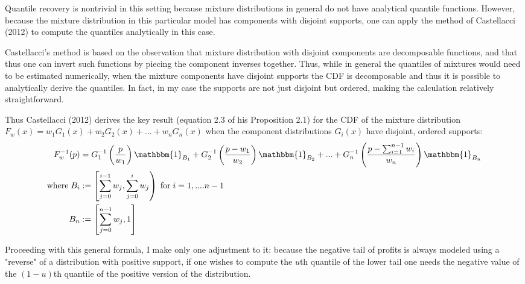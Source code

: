 \documentclass[english,12pt]{article}\usepackage{lmodern}
\numberwithin{equation}{section}
\begin{document}
 Quantile recovery is nontrivial in this setting because mixture distributions in general do not have analytical quantile functions. However, because the mixture distribution in this particular model has components with disjoint supports, one can apply the method of Castellacci (2012) to compute the quantiles analytically in this case.
 
Castellacci's method is based on the observation that mixture distribution with disjoint components are decomposable functions, and that thus one can invert such functions by piecing the component inverses together.  Thus, while in general the quantiles of mixtures would need to be estimated numerically, when the mixture components have disjoint supports the CDF is decomposable and thus it is possible to analytically derive the quantiles. In fact, in my case the supports are not just disjoint but ordered, making the calculation relatively straightforward. 

Thus Castellacci (2012) derives the key result (equation 2.3 of his Proposition 2.1) for the CDF of the mixture distribution $F_{w}(x) = w_1 G_1(x) + w_2 G_2 (x) + ... + w_n G_n (x)$ when the component distributions $G_i (x)$ have disjoint, ordered supports:
\begin{equation}
\begin{aligned}
F^{-1}_{w} (p) &= G_1^{-1}\left( \frac{p}{w_1} \right) \mathbbm{1}_{B_1}  +  G_2^{-1}\left( \frac{p - w_1}{w_2} \right) \mathbbm{1}_{B_2} + ... +  G_n^{-1}\left( \frac{p - \sum_{i=1}^{n-1} w_i}{w_n} \right) \mathbbm{1}_{B_n}\\
\text{where} \; B_{i} &:= \left[ \sum_{j=0}^{i-1} w_j, \sum_{j=0}^i w_j \right) \; \text{for} \; i = 1,....n-1 \\
B_n &:=  \left[ \sum_{j=0}^{n-1} w_j, 1\right]
\end{aligned}
\end{equation}

Proceeding with this general formula, I make only one adjustment to it: because the negative tail of profits is always modeled using a "reverse" of a distribution with positive support, if one wishes to compute the $u$th quantile of the lower tail one needs the negative value of the $(1-u)$th quantile of the positive version of the distribution. 
\end{document}
